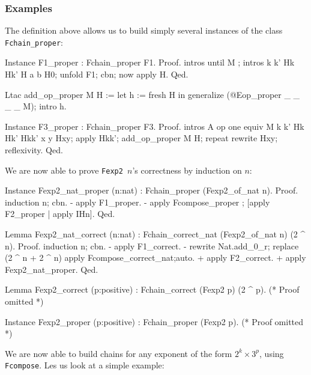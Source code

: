 \subsubsection{Examples}
The definition above allows us  to build simply several instances of the class \linebreak
\texttt{Fchain\_proper}:

\begin{Coqsrc}
Instance F1_proper : Fchain_proper F1.
Proof.
  intros until M ; intros k k' Hk Hk' H a b H0; unfold F1; cbn;
  now apply H.  
Qed.
\end{Coqsrc}

\begin{Coqsrc}
Ltac add_op_proper M H := 
 let h := fresh H in
   generalize (@Eop_proper _ _ _ _ M); intro h.


Instance F3_proper : Fchain_proper F3.
Proof.
  intros  A op one equiv M  k k' Hk Hk'  Hkk' x y Hxy;  
  apply Hkk'; add_op_proper M H; repeat rewrite Hxy;
  reflexivity.
Qed.
\end{Coqsrc}


We are now able to prove  \texttt{Fexp2 $n$}'s correctness by induction 
on $n$:

\begin{Coqsrc}
Instance Fexp2_nat_proper (n:nat) : 
                           Fchain_proper (Fexp2_of_nat n).
Proof.
 induction n; cbn.
   - apply F1_proper.
   - apply Fcompose_proper ; [apply F2_proper | apply IHn].
Qed.
\end{Coqsrc}

\begin{Coqsrc}
Lemma  Fexp2_nat_correct (n:nat) : 
         Fchain_correct_nat (Fexp2_of_nat n) (2  ^ n).
Proof.
  induction n; cbn.
 - apply F1_correct.
 -  rewrite Nat.add_0_r;
   replace (2 ^ n + 2 ^ n)%
   apply Fcompose_correct_nat;auto.
   +  apply F2_correct.
   +  apply  Fexp2_nat_proper.
Qed.
\end{Coqsrc}

\begin{Coqsrc}
Lemma  Fexp2_correct (p:positive) : 
                           Fchain_correct (Fexp2 p) (2  ^ p).
(* Proof omitted *)

Instance  Fexp2_proper (p:positive) : Fchain_proper (Fexp2 p).
(* Proof omitted *)

\end{Coqsrc}

We are now  able to build chains for any exponent of the form 
$2^k\times 3^p$, using \texttt{Fcompose}. Les us look at a simple example:

